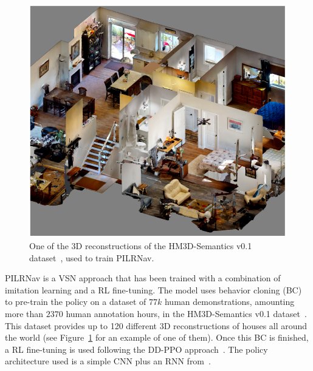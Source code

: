 \begin{figure}[t]
    \centering
    \includegraphics[width=\linewidth]{figures/ros4vsn/dataset_scene}
    \caption{One of the 3D reconstructions of the HM3D-Semantics v0.1 dataset~\cite{Ramakrishnan2021HabitatMatterport3D}, used to train PILRNav.}
    \label{fig:scene_hm3d}
\end{figure}

PILRNav is a VSN approach that has been trained with a combination of imitation learning and a RL fine-tuning.
The model uses behavior cloning (BC) to pre-train the \objnav policy on a dataset of $77k$ human demonstrations, amounting more than $2370$ human annotation hours, in the HM3D-Semantics v0.1 dataset~\cite{Ramakrishnan2021HabitatMatterport3D}.
This dataset provides up to 120 different 3D reconstructions of houses all around the world (see Figure~\ref{fig:scene_hm3d} for an example of one of them).
Once this BC is finished, a RL fine-tuning is used following the DD-PPO approach~\cite{Wijmans2019DDPPOLN}.
The policy architecture used is a simple CNN plus an RNN from~\cite{yadav2022}.

